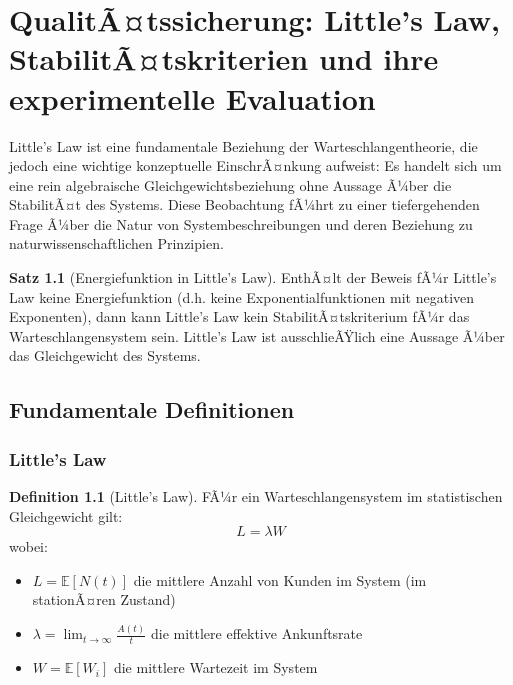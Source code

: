 ﻿\documentclass[a4paper,12pt]{report}
\theoremstyle{definition}
\newtheorem{definition}{Definition}[section]
\newtheorem{satz}{Satz}[section]
\begin{document}

\chapter{QualitÃ¤tssicherung: Little's Law, StabilitÃ¤tskriterien und ihre experimentelle Evaluation}
\label{ch:qualitaetssicherung}

Little's Law ist eine fundamentale Beziehung der Warteschlangentheorie, die jedoch eine wichtige konzeptuelle EinschrÃ¤nkung aufweist: Es handelt sich um eine rein algebraische Gleichgewichtsbeziehung ohne Aussage Ã¼ber die StabilitÃ¤t des Systems. Diese Beobachtung fÃ¼hrt zu einer tiefergehenden Frage Ã¼ber die Natur von Systembeschreibungen und deren Beziehung zu naturwissenschaftlichen Prinzipien.

\begin{satz}[Energiefunktion in Little's Law]
	EnthÃ¤lt der Beweis fÃ¼r Little's Law keine Energiefunktion (d.h. keine Exponentialfunktionen mit negativen Exponenten), dann kann Little's Law kein StabilitÃ¤tskriterium fÃ¼r das Warteschlangensystem sein. Little's Law ist ausschlieÃŸlich eine Aussage Ã¼ber das Gleichgewicht des Systems.
\end{satz}

\section{Fundamentale Definitionen}

\subsection{Little's Law}

\begin{definition}[Little's Law]
	FÃ¼r ein Warteschlangensystem im statistischen Gleichgewicht gilt:
	\begin{equation}
		L = \lambda W
	\end{equation}
	wobei:
	\begin{itemize}
		\item[-] $L = \mathbb{E}[N(t)]$ die mittlere Anzahl von Kunden im System (im stationÃ¤ren Zustand)
		\item[-] $\lambda = \lim_{t \to \infty} \frac{A(t)}{t}$ die mittlere effektive Ankunftsrate
		\item[-] $W = \mathbb{E}[W_i]$ die mittlere Wartezeit im System
	\end{itemize}
\end{definition}
\end{document}
